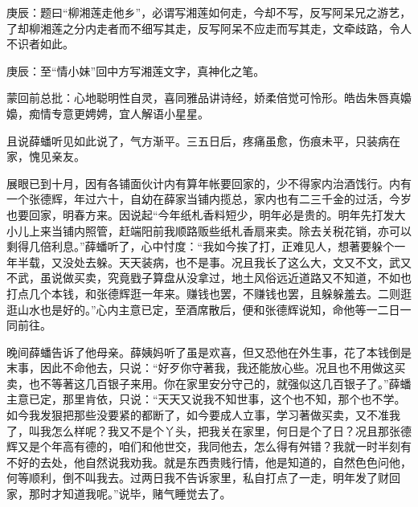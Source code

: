 \begin{parag}

    \begin{note}庚辰：题曰“柳湘莲走他乡”，必谓写湘莲如何走，今却不写，反写阿呆兄之游艺，了却柳湘莲之分内走者而不细写其走，反写阿呆不应走而写其走，文牵歧路，令人不识者如此。\end{note}
\end{parag}


\begin{parag}


    \begin{note}庚辰：至“情小妹”回中方写湘莲文字，真神化之笔。\end{note}
\end{parag}


\begin{parag}


    \begin{note}蒙回前总批：心地聪明性自灵，喜同雅品讲诗经，娇柔倍觉可怜形。皓齿朱唇真嬝嬝，痴情专意更娉娉，宜人解语小星星。\end{note}
\end{parag}

\begin{parag}

    且说薛蟠听见如此说了，气方渐平。三五日后，疼痛虽愈，伤痕未平，只装病在家，愧见亲友。
\end{parag}


\begin{parag}


    展眼已到十月，因有各铺面伙计内有算年帐要回家的，少不得家内治酒饯行。内有一个张德辉，年过六十，自幼在薛家当铺内揽总，家内也有二三千金的过活，今岁也要回家，明春方来。因说起“今年纸札香料短少，明年必是贵的。明年先打发大小儿上来当铺内照管，赶端阳前我顺路贩些纸札香扇来卖。除去关税花销，亦可以剩得几倍利息。”薛蟠听了，心中忖度：“我如今挨了打，正难见人，想著要躲个一年半载，又没处去躲。天天装病，也不是事。况且我长了这么大，文又不文，武又不武，虽说做买卖，究竟戥子算盘从没拿过，地土风俗远近道路又不知道，不如也打点几个本钱，和张德辉逛一年来。赚钱也罢，不赚钱也罢，且躲躲羞去。二则逛逛山水也是好的。”心内主意已定，至酒席散后，便和张德辉说知，命他等一二日一同前往。
\end{parag}


\begin{parag}


    晚间薛蟠告诉了他母亲。薛姨妈听了虽是欢喜，但又恐他在外生事，花了本钱倒是末事，因此不命他去，只说：“好歹你守著我，我还能放心些。况且也不用做这买卖，也不等著这几百银子来用。你在家里安分守己的，就强似这几百银子了。”薛蟠主意已定，那里肯依，只说：“天天又说我不知世事，这个也不知，那个也不学。如今我发狠把那些没要紧的都断了，如今要成人立事，学习著做买卖，又不准我了，叫我怎么样呢？我又不是个丫头，把我关在家里，何日是个了日？况且那张德辉又是个年高有德的，咱们和他世交，我同他去，怎么得有舛错？我就一时半刻有不好的去处，他自然说我劝我。就是东西贵贱行情，他是知道的，自然色色问他，何等顺利，倒不叫我去。过两日我不告诉家里，私自打点了一走，明年发了财回家，那时才知道我呢。”说毕，赌气睡觉去了。
\end{parag}


